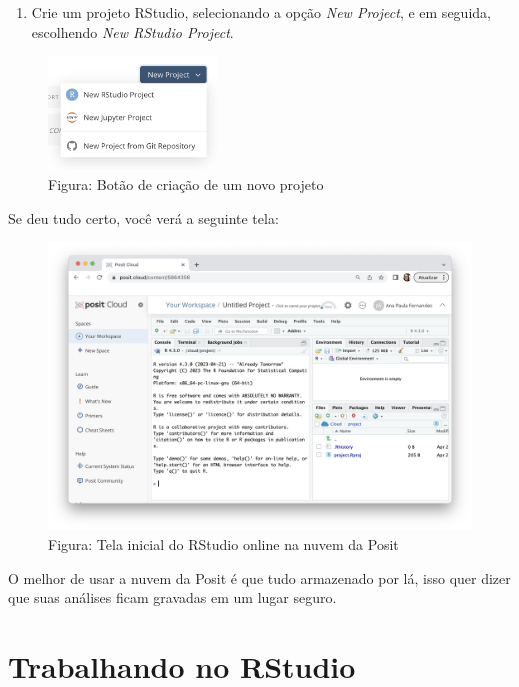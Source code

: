 \documentclass[
]{book}
\providecommand{\tightlist}{%
  \setlength{\itemsep}{0pt}\setlength{\parskip}{0pt}}
\begin{document}
\begin{enumerate}
\def\labelenumi{\arabic{enumi}.}
\setcounter{enumi}{3}
\tightlist
\item
  Crie um projeto RStudio, selecionando a opção \emph{New Project}, e em seguida, escolhendo \emph{New RStudio Project}.
\end{enumerate}

\begin{figure}
\centering
\includegraphics[width=0.4\textwidth,height=\textheight]{telaCriarProjetoRStudio.png}
\caption{Figura: Botão de criação de um novo projeto}
\end{figure}

Se deu tudo certo, você verá a seguinte tela:

\begin{figure}
\centering
\includegraphics{telaRStudioPosit.png}
\caption{Figura: Tela inicial do RStudio online na nuvem da Posit}
\end{figure}

O melhor de usar a nuvem da Posit é que tudo armazenado por lá, isso quer dizer que suas análises ficam gravadas em um lugar seguro.

\chapter{Trabalhando no RStudio}\label{trabalhando-RStudio}
\end{document}
